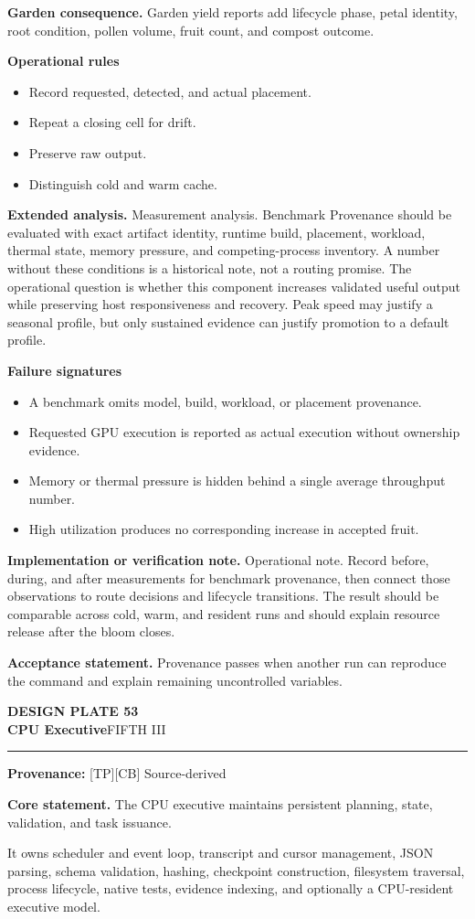 \documentclass[10pt,letterpaper,oneside]{article}
\newcommand{\prov}[1]{\textcolor{gardenBlue}{\sffamily\footnotesize\textbf{Provenance:} #1}}
\newcommand{\platetitle}[3]{%
  \begin{minipage}[t][0.54in][t]{\textwidth}
  {\sffamily\bfseries\color{gardenDeep}\fontsize{9}{10}\selectfont DESIGN PLATE #1}\\[-1pt]
  {\sffamily\bfseries\color{gardenInk}\fontsize{16.5}{18}\selectfont #2}\hfill{\sffamily\color{gardenGreen}\large #3}
  \end{minipage}\vspace{-2pt}\hrule\vspace{5pt}}
\begin{document}
\textbf{Garden consequence.} Garden yield reports add lifecycle phase, petal identity, root condition, pollen volume, fruit count, and compost outcome.

\textbf{Operational rules}
\begin{itemize}
\item Record requested, detected, and actual placement.
\item Repeat a closing cell for drift.
\item Preserve raw output.
\item Distinguish cold and warm cache.
\end{itemize}
\textbf{Extended analysis.} Measurement analysis. Benchmark Provenance should be evaluated with exact artifact identity, runtime build, placement, workload, thermal state, memory pressure, and competing-process inventory. A number without these conditions is a historical note, not a routing promise. The operational question is whether this component increases validated useful output while preserving host responsiveness and recovery. Peak speed may justify a seasonal profile, but only sustained evidence can justify promotion to a default profile.

\textbf{Failure signatures}
\begin{itemize}
\item A benchmark omits model, build, workload, or placement provenance.
\item Requested GPU execution is reported as actual execution without ownership evidence.
\item Memory or thermal pressure is hidden behind a single average throughput number.
\item High utilization produces no corresponding increase in accepted fruit.
\end{itemize}
\textbf{Implementation or verification note.} Operational note. Record before, during, and after measurements for benchmark provenance, then connect those observations to route decisions and lifecycle transitions. The result should be comparable across cold, warm, and resident runs and should explain resource release after the bloom closes.

\begin{acceptbox}
\textbf{Acceptance statement.} Provenance passes when another run can reproduce the command and explain remaining uncontrolled variables.
\end{acceptbox}
\newpage
\platetitle{53}{CPU Executive}{FIFTH III}
\prov{[TP][CB] Source-derived}
\fontsize{8.85}{10.45}\selectfont
\begin{corebox}
\textbf{Core statement.} The CPU executive maintains persistent planning, state, validation, and task issuance.
\end{corebox}
It owns scheduler and event loop, transcript and cursor management, JSON parsing, schema validation, hashing, checkpoint construction, filesystem traversal, process lifecycle, native tests, evidence indexing, and optionally a CPU-resident executive model.
\end{document}
